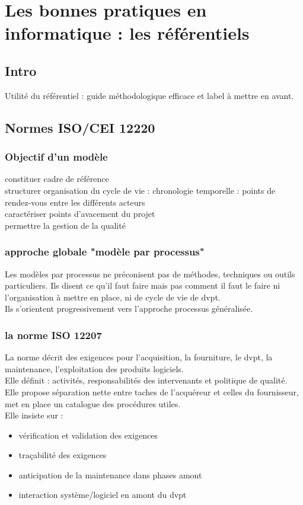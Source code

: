 \chapter{Les bonnes pratiques en informatique : les référentiels}

\section{Intro}

Utilité du référentiel : guide méthodologique efficace et label à mettre en avant. 

\section{Normes ISO/CEI 12220}

	\subsection{Objectif d’un modèle}

constituer cadre de référence\\
structurer organisation du cycle de vie : chronologie temporelle : points de rendez-vous entre les différents acteurs\\
caractériser points d’avacement du projet\\
permettre la gestion de la qualité\\

	\subsection{approche globale "modèle par processus"}

Les modèles par processus ne préconisent pas de méthodes, techniques ou outils particuliers. Ils disent ce qu’il faut faire mais pas comment il faut le faire ni l’organisation à mettre en place, ni de cycle de vie de dvpt.\\
Ils s’orientent progressivement vers l’approche processus généralisée.

	\subsection{la norme ISO 12207}

La norme décrit des exigences pour l’acquisition, la fourniture, le dvpt, la maintenance, l’exploitation des produits logiciels.\\
Elle définit : activités, responsabilités des intervenants et politique de qualité.\\
Elle propose séparation nette entre taches de l’acquéreur et celles du fournisseur, met en place un catalogue des procédures utiles.\\
Elle insiste sur :
\begin{itemize}
\item vérification et validation des exigences
\item traçabilité des exigences
\item anticipation de la maintenance dans phases amont
\item interaction système/logiciel en amont du dvpt
\end{itemize}


